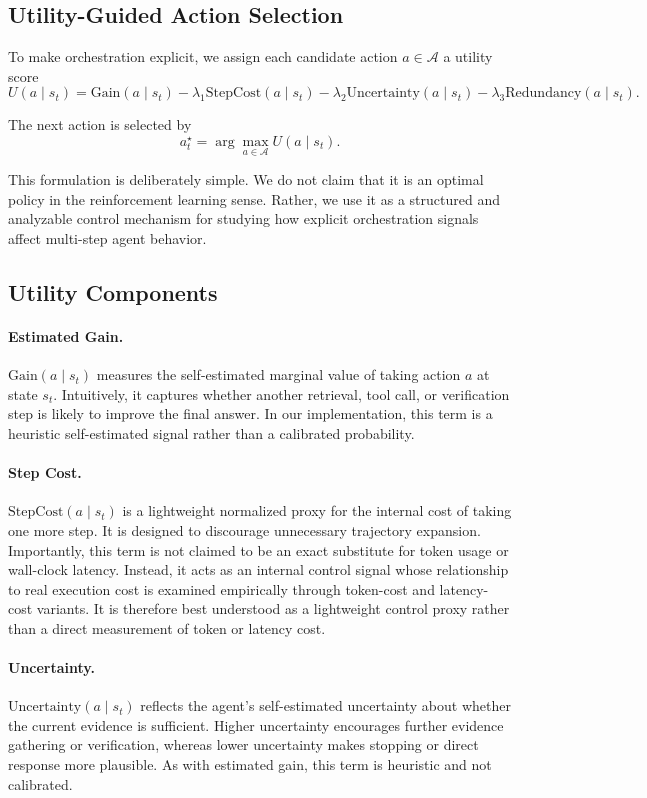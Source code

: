\subsection{Utility-Guided Action Selection}

To make orchestration explicit, we assign each candidate action $a \in \mathcal{A}$ a utility score
\[
U(a \mid s_t)
=
\mathrm{Gain}(a \mid s_t)
-
\lambda_1 \mathrm{StepCost}(a \mid s_t)
-
\lambda_2 \mathrm{Uncertainty}(a \mid s_t)
-
\lambda_3 \mathrm{Redundancy}(a \mid s_t).
\]

The next action is selected by
\[
a_t^\star = \arg\max_{a \in \mathcal{A}} U(a \mid s_t).
\]

This formulation is deliberately simple. We do not claim that it is an optimal policy in the reinforcement learning sense. Rather, we use it as a structured and analyzable control mechanism for studying how explicit orchestration signals affect multi-step agent behavior.

\subsection{Utility Components}

\paragraph{Estimated Gain.}
$\mathrm{Gain}(a \mid s_t)$ measures the self-estimated marginal value of taking action $a$ at state $s_t$. Intuitively, it captures whether another retrieval, tool call, or verification step is likely to improve the final answer. In our implementation, this term is a heuristic self-estimated signal rather than a calibrated probability.

\paragraph{Step Cost.}
$\mathrm{StepCost}(a \mid s_t)$ is a lightweight normalized proxy for the internal cost of taking one more step. It is designed to discourage unnecessary trajectory expansion. Importantly, this term is not claimed to be an exact substitute for token usage or wall-clock latency. Instead, it acts as an internal control signal whose relationship to real execution cost is examined empirically through token-cost and latency-cost variants. It is therefore best understood as a lightweight control proxy rather than a direct measurement of token or latency cost.

\paragraph{Uncertainty.}
$\mathrm{Uncertainty}(a \mid s_t)$ reflects the agent's self-estimated uncertainty about whether the current evidence is sufficient. Higher uncertainty encourages further evidence gathering or verification, whereas lower uncertainty makes stopping or direct response more plausible. As with estimated gain, this term is heuristic and not calibrated.

